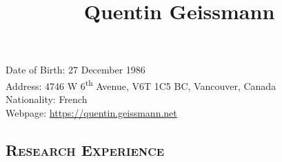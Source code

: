 \documentclass[12pt]{article}
\title{\bfseries\Huge Quentin Geissmann}
\author{\href{mailto:\sendTo}{\mymail}}
\date{}
\begin{document}
\maketitle

\begin{minipage}[ht]{0.68\textwidth}
Date of Birth: 27 December 1986\\
Address: 4746 W 6\textsuperscript{th} Avenue, V6T 1C5 BC, Vancouver, Canada\\
Nationality: French\\
Webpage: \href{https://quentin.geissmann.net}{https://quentin.geissmann.net}
\end{minipage}
\vspace{1pt}
\subsection*{\textsc{Research Experience}}
\end{document}
